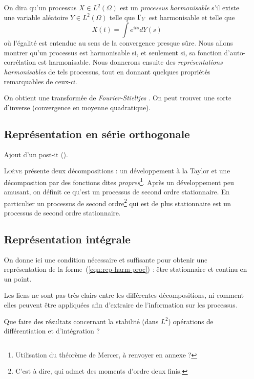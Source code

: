 On dira qu'un processus $X\in L^2(\Omega)$ est un \emph{processus
  harmonisable} s'il existe une variable aléatoire $Y\in L^2(\Omega)$
telle que $\Gamma_Y$ est harmonisable et telle que
\begin{equation}
  \label{eqn:rep-harm-proc}
  X(t) = \int e^{its} dY(s)
\end{equation}
où l'égalité est entendue au sens de la convergence presque sûre. Nous
allons montrer qu'un processus est harmonisable si, et seulement si,
sa fonction d'auto-corrélation est harmonisable. Nous donnerons
ensuite des \emph{représentations harmonisables} de tels processus,
tout en donnant quelques propriétés remarquables de ceux-ci.

\begin{alert}
  On obtient une \og transformée de \emph{Fourier-Stieltjes} \fg{}. On
  peut trouver une sorte d'inverse (convergence en moyenne
  quadratique).
\end{alert}

\subsection{Représentation en série orthogonale}

\begin{alert}
  Ajout d'un post-it (\cite[p.~143]{loeve1978}).
\end{alert}

\textsc{Loève} présente deux décompositions : un développement à la
Taylor et une décomposition par des fonctions dites
\emph{propres}\footnote{Utilisation du théorème de Mercer, à renvoyer
  en annexe ?}. Après un développement peu amusant, on définit ce
qu'est un processus de second ordre stationnaire. En particulier un
processus de second ordre\footnote{C'est à dire, qui admet des moments
  d'ordre deux finis.} qui est de plus stationnaire est un processus de
second ordre stationnaire.

\subsection{Représentation intégrale}
On donne ici une condition nécessaire et suffisante pour obtenir une
représentation de la forme~(\ref{eqn:rep-harm-proc}) : être
stationnaire et continu en un point.

\begin{alert}
  Les liens ne sont pas très clairs entre les différentes
  décompositions, ni comment elles peuvent être appliquées afin
  d'extraire de l'information sur les processus.
\end{alert}

\begin{question}
  Que faire des résultats concernant la stabilité (dans $L^2$)
  opérations de différentiation et d'intégration ?
\end{question}